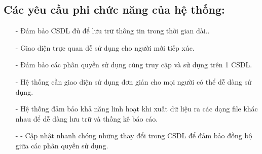 \documentclass{article}
\begin{document}
\begin{flushleft}
		\fontsize{14}{20}\selectfont
		\subsection{Các yêu cầu phi chức năng của hệ thống:}
		\fontsize{13}{20}\selectfont
		\begin{itemize}
			\item[-]Đảm bảo CSDL đủ để lưu trữ thông tin trong thời gian dài..
			\item[-]Giao diện trực quan dễ sử dụng cho người mới tiếp xúc.
			\item[-]Đảm bảo các phân quyền sử dụng cùng truy cập và sử dụng trên 1 CSDL.
			\item[-]Hệ thống cần giao diện sử dụng đơn giản cho mọi người có thể dễ dàng sử dụng.
			\item[-]Hệ thống đảm bảo khả năng linh hoạt khi xuất dữ liệu ra các dạng file khác nhau để dễ dàng lưu trữ và thống kê báo cáo.
			\item[-]-	Cập nhật nhanh chóng những thay đổi trong CSDL để đảm bảo đồng bộ giữa các phân quyền sử dụng.
		\end{itemize}
		
		
	\end{flushleft}
\end{document}
